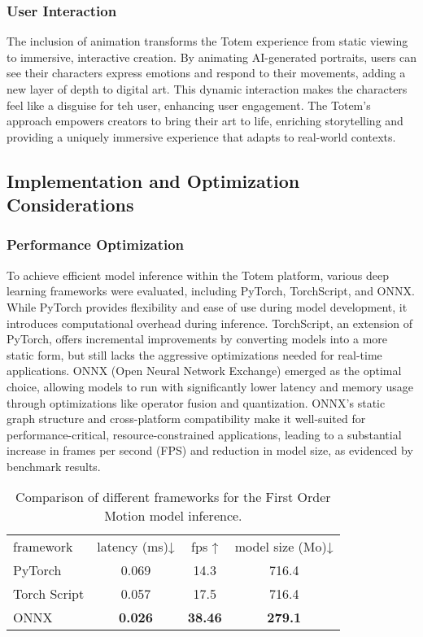 \subsubsection{User Interaction}
The inclusion of animation transforms the Totem experience from static viewing to immersive, interactive creation.
By animating AI-generated portraits, users can see their characters express emotions and respond to their movements, adding a new layer of depth to digital art.
This dynamic interaction makes the characters feel like a disguise for teh user, enhancing user engagement.
The Totem’s approach empowers creators to bring their art to life, enriching storytelling and providing a uniquely immersive experience that adapts to real-world contexts.

\subsection{Implementation and Optimization Considerations}

\subsubsection{Performance Optimization}
To achieve efficient model inference within the Totem platform, various deep learning frameworks were evaluated, including PyTorch, TorchScript, and ONNX.
While PyTorch provides flexibility and ease of use during model development, it introduces computational overhead during inference.
TorchScript, an extension of PyTorch, offers incremental improvements by converting models into a more static form, but still lacks the aggressive optimizations needed for real-time applications.
ONNX (Open Neural Network Exchange) emerged as the optimal choice, allowing models to run with significantly lower latency and memory usage through optimizations like operator fusion and quantization.
ONNX’s static graph structure and cross-platform compatibility make it well-suited for performance-critical, resource-constrained applications, leading to a substantial increase in frames per second (FPS) and reduction in model size, as evidenced by benchmark results.

\begin{table}[!h]
\footnotesize%
\begin{center}
    \begin{tabular}{lccc}
    \toprule
    framework    & latency (ms)↓ & fps ↑  & model size (Mo)↓ \\
    PyTorch      & 0.069        & 14.3  & 716.4           \\
    Torch Script & 0.057        & 17.5  & 716.4           \\
    ONNX         & \textbf{0.026}& \textbf{38.46} & \textbf{279.1}           \\
    \bottomrule
    \end{tabular}
\end{center}
\caption{Comparison of different frameworks for the First Order Motion model inference.}
\label{tab:frameworks}
\end{table}

